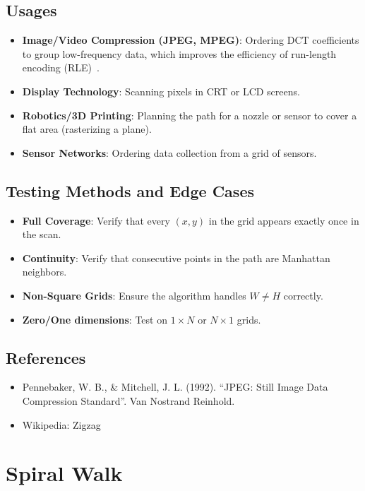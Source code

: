 \subsection{Usages}
\begin{itemize}
    \item \textbf{Image/Video Compression (JPEG, MPEG)}: Ordering DCT coefficients to group low-frequency data, which improves the efficiency of run-length encoding (RLE)~\cite{pennebaker1992}.
    \item \textbf{Display Technology}: Scanning pixels in CRT or LCD screens.
    \item \textbf{Robotics/3D Printing}: Planning the path for a nozzle or sensor to cover a flat area (rasterizing a plane).
    \item \textbf{Sensor Networks}: Ordering data collection from a grid of sensors.
\end{itemize}

\subsection{Testing Methods and Edge Cases}
\begin{itemize}
    \item \textbf{Full Coverage}: Verify that every $(x, y)$ in the grid appears exactly once in the scan.
    \item \textbf{Continuity}: Verify that consecutive points in the path are Manhattan neighbors.
    \item \textbf{Non-Square Grids}: Ensure the algorithm handles $W \ne H$ correctly.
    \item \textbf{Zero/One dimensions}: Test on $1 \times N$ or $N \times 1$ grids.
\end{itemize}

\subsection{References}
\begin{itemize}
    \item Pennebaker, W. B., \& Mitchell, J. L. (1992). ``JPEG: Still Image Data Compression Standard''. Van Nostrand Reinhold.
    \item Wikipedia: Zigzag
\end{itemize}


\section{Spiral Walk}
\label{sec:spiral_walk}

